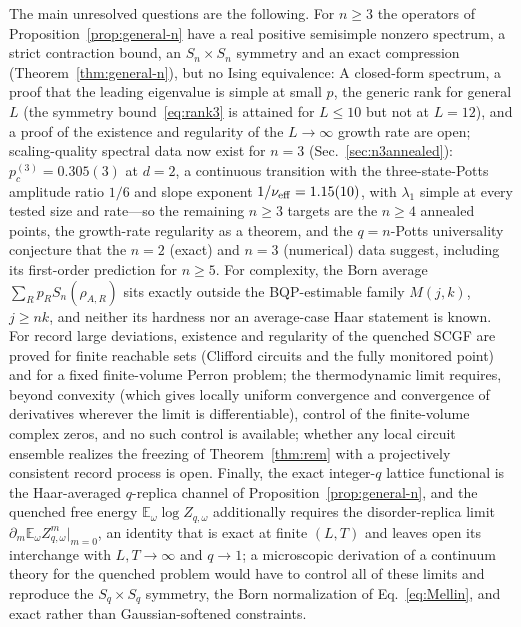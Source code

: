 \documentclass[aps,prx,reprint,superscriptaddress,nobibnotes,longbibliography]{revtex4-2}
\theoremstyle{remark}
\newcommand{\E}{\mathbb E}
\begin{document}
The main unresolved questions are the following.  For $n\ge3$ the operators of Proposition~\ref{prop:general-n} have a real positive semisimple nonzero spectrum, a strict contraction bound, an $S_n\times S_n$ symmetry and an exact compression (Theorem~\ref{thm:general-n}), but no Ising equivalence: A closed-form spectrum, a proof that the leading eigenvalue is simple at small $p$, the generic rank for general $L$ (the symmetry bound~\eqref{eq:rank3} is attained for $L\le10$ but not at $L=12$), and a proof of the existence and regularity of the $L\to\infty$ growth rate are open; scaling-quality spectral data now exist for $n=3$ (Sec.~\ref{sec:n3annealed}): $p_c^{(3)}=0.305(3)$ at $d=2$, a continuous transition with the three-state-Potts amplitude ratio $1/6$ and slope exponent $1/\nu_{\rm eff}=1.15(10)$, with $\lambda_1$ simple at every tested size and rate—so the remaining $n\ge3$ targets are the $n\ge4$ annealed points, the growth-rate regularity as a theorem, and the $q=n$-Potts universality conjecture that the $n=2$ (exact) and $n=3$ (numerical) data suggest, including its first-order prediction for $n\ge5$.  For complexity, the Born average $\sum_Rp_RS_n(\rho_{A,R})$ sits exactly outside the BQP-estimable family $M(j,k)$, $j\ge nk$, and neither its hardness nor an average-case Haar statement is known.  For record large deviations, existence and regularity of the quenched SCGF are proved for finite reachable sets (Clifford circuits and the fully monitored point) and for a fixed finite-volume Perron problem; the thermodynamic limit requires, beyond convexity (which gives locally uniform convergence and convergence of derivatives wherever the limit is differentiable), control of the finite-volume complex zeros, and no such control is available; whether any local circuit ensemble realizes the freezing of Theorem~\ref{thm:rem} with a projectively consistent record process is open.  Finally, the exact integer-$q$ lattice functional is the Haar-averaged $q$-replica channel of Proposition~\ref{prop:general-n}, and the quenched free energy $\E_\omega\log Z_{q,\omega}$ additionally requires the disorder-replica limit $\partial_m\E_\omega Z_{q,\omega}^m|_{m=0}$, an identity that is exact at finite $(L,T)$ and leaves open its interchange with $L,T\to\infty$ and $q\to1$; a microscopic derivation of a continuum theory for the quenched problem would have to control all of these limits and reproduce the $S_q\times S_q$ symmetry, the Born normalization of Eq.~\eqref{eq:Mellin}, and exact rather than Gaussian-softened constraints.
\end{document}
